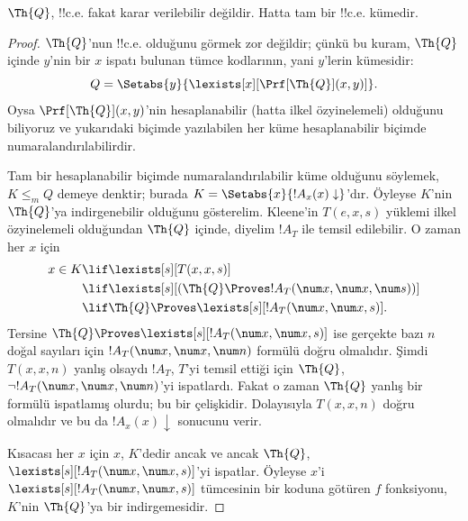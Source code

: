




\begin{thm}
$\Th{Q}$, !!{c.e.} fakat karar verilebilir değildir. Hatta tam bir
  !!{c.e.} kümedir.
\end{thm}

\begin{proof}
$\Th{Q}$'nun !!{c.e.} olduğunu görmek zor değildir; çünkü bu kuram,
$\Th{Q}$ içinde $y$'nin bir $x$ ispatı bulunan tümce kodlarının, yani
$y$'lerin kümesidir:
\[
Q = \Setabs{y}{\lexists[x][\Prf[\Th{Q}](x,y)]}.
\]
Oysa $\Prf[\Th{Q}](x,y)$'nin hesaplanabilir (hatta ilkel özyinelemeli)
olduğunu biliyoruz ve yukarıdaki biçimde yazılabilen her küme hesaplanabilir
biçimde numaralandırılabilirdir.

Tam bir hesaplanabilir biçimde numaralandırılabilir küme olduğunu söylemek,
$K \leq_m Q$ demeye denktir; burada
$K = \Setabs{x}{!A_x(x) \downarrow}$'dır. Öyleyse $K$'nin $\Th{Q}$'ya
indirgenebilir olduğunu gösterelim. Kleene'in $T(e,x,s)$ yüklemi ilkel
özyinelemeli olduğundan $\Th{Q}$ içinde, diyelim $!A_T$ ile temsil
edilebilir. O zaman her $x$ için
\begin{align*}
x \in K & \lif \lexists[s][T(x,x,s)] \\
& \lif \lexists[s][(\Th{Q} \Proves !A_T(\num x,\num x, \num s))]
  \\
& \lif \Th{Q} \Proves \lexists[s][!A_T(\num x, \num x, s)].
\end{align*}
Tersine $\Th{Q} \Proves \lexists[s][!A_T(\num x, \num x, s)]$ ise gerçekte
bazı $n$ doğal sayıları için $!A_T(\num x, \num x, \num n)$ formülü doğru
olmalıdır. Şimdi $T(x,x,n)$ yanlış olsaydı $!A_T$, $T$'yi temsil ettiği için
$\Th{Q}$, $\lnot !A_T(\num x, \num x, \num n)$'yi ispatlardı. Fakat o zaman
$\Th{Q}$ yanlış bir formülü ispatlamış olurdu; bu bir çelişkidir. Dolayısıyla
$T(x,x,n)$ doğru olmalıdır ve bu da $!A_x(x) \downarrow$ sonucunu verir.

Kısacası her $x$ için $x$, $K$'dedir ancak ve ancak $\Th{Q}$,
$\lexists[s][!A_T(\num x,\num x,s)]$'yi ispatlar. Öyleyse $x$'i
$\lexists[s][!A_T(\num x, \num x, s)]$ tümcesinin bir koduna götüren $f$
fonksiyonu, $K$'nin $\Th{Q}$'ya bir indirgemesidir.
\end{proof}

